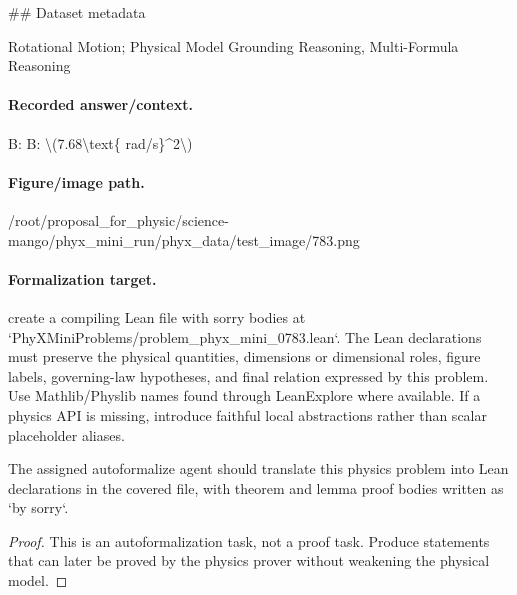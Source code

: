 \#\# Dataset metadata

Rotational Motion; Physical Model Grounding Reasoning, Multi-Formula Reasoning

\paragraph{Recorded answer/context.}
B: B: \textbackslash{}(7.68\textbackslash{}text\{ rad/s\}\textasciicircum{}2\textbackslash{})

\paragraph{Figure/image path.}
/root/proposal\_for\_physic/science-mango/phyx\_mini\_run/phyx\_data/test\_image/783.png

\paragraph{Formalization target.}
create a compiling Lean file with sorry bodies at `PhyXMiniProblems/problem\_phyx\_mini\_0783.lean`. The Lean declarations must preserve the physical quantities, dimensions or dimensional roles, figure labels, governing-law hypotheses, and final relation expressed by this problem.
Use Mathlib/Physlib names found through LeanExplore where available. If a physics API is missing, introduce faithful local abstractions rather than scalar placeholder aliases.

\begin{theorem}
\label{thm:physics:phyx_mini_0783:target}
The assigned autoformalize agent should translate this physics problem into Lean declarations in the covered file, with theorem and lemma proof bodies written as `by sorry`.
\end{theorem}
\begin{proof}
This is an autoformalization task, not a proof task. Produce statements that can later be proved by the physics prover without weakening the physical model.
\end{proof}

